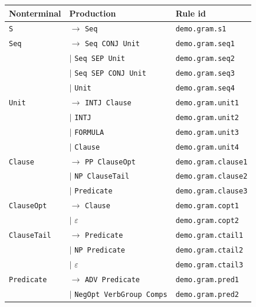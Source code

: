 \begin{longtable}{@{}l l l@{}}
\toprule
\textbf{Nonterminal} & \textbf{Production} & \textbf{Rule id} \\
\midrule
\endhead
\bottomrule
\endfoot
\texttt{S} & $\rightarrow$ \texttt{Seq} & \scriptsize\texttt{demo.gram.s1} \\
\addlinespace
\texttt{Seq} & $\rightarrow$ \texttt{Seq CONJ Unit} & \scriptsize\texttt{demo.gram.seq1} \\
\texttt{} & $\mid$ \texttt{Seq SEP Unit} & \scriptsize\texttt{demo.gram.seq2} \\
\texttt{} & $\mid$ \texttt{Seq SEP CONJ Unit} & \scriptsize\texttt{demo.gram.seq3} \\
\texttt{} & $\mid$ \texttt{Unit} & \scriptsize\texttt{demo.gram.seq4} \\
\addlinespace
\texttt{Unit} & $\rightarrow$ \texttt{INTJ Clause} & \scriptsize\texttt{demo.gram.unit1} \\
\texttt{} & $\mid$ \texttt{INTJ} & \scriptsize\texttt{demo.gram.unit2} \\
\texttt{} & $\mid$ \texttt{FORMULA} & \scriptsize\texttt{demo.gram.unit3} \\
\texttt{} & $\mid$ \texttt{Clause} & \scriptsize\texttt{demo.gram.unit4} \\
\addlinespace
\texttt{Clause} & $\rightarrow$ \texttt{PP ClauseOpt} & \scriptsize\texttt{demo.gram.clause1} \\
\texttt{} & $\mid$ \texttt{NP ClauseTail} & \scriptsize\texttt{demo.gram.clause2} \\
\texttt{} & $\mid$ \texttt{Predicate} & \scriptsize\texttt{demo.gram.clause3} \\
\addlinespace
\texttt{ClauseOpt} & $\rightarrow$ \texttt{Clause} & \scriptsize\texttt{demo.gram.copt1} \\
\texttt{} & $\mid$ $\varepsilon$ & \scriptsize\texttt{demo.gram.copt2} \\
\addlinespace
\texttt{ClauseTail} & $\rightarrow$ \texttt{Predicate} & \scriptsize\texttt{demo.gram.ctail1} \\
\texttt{} & $\mid$ \texttt{NP Predicate} & \scriptsize\texttt{demo.gram.ctail2} \\
\texttt{} & $\mid$ $\varepsilon$ & \scriptsize\texttt{demo.gram.ctail3} \\
\addlinespace
\texttt{Predicate} & $\rightarrow$ \texttt{ADV Predicate} & \scriptsize\texttt{demo.gram.pred1} \\
\texttt{} & $\mid$ \texttt{NegOpt VerbGroup Comps} & \scriptsize\texttt{demo.gram.pred2} \\

\end{longtable}
